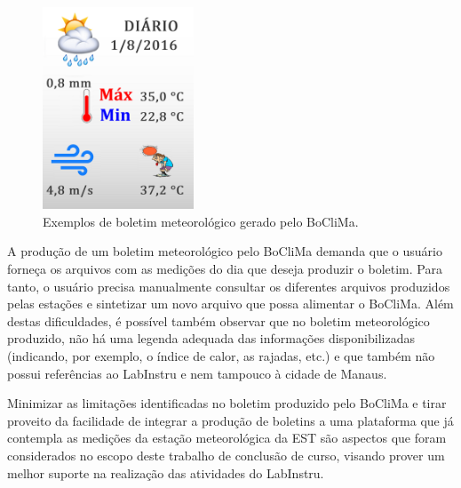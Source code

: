 \begin{figure}[h!]
	\centering
	\includegraphics[width=0.4\textwidth]{./img/boclima}
	\caption{Exemplos de boletim meteorológico gerado pelo BoCliMa. } \label{fig:boclima}
\end{figure}

A produção de um boletim meteorológico pelo BoCliMa demanda que o usuário forneça os arquivos com as medições do dia que deseja produzir o boletim. Para tanto, o usuário precisa manualmente consultar os diferentes arquivos produzidos pelas estações e sintetizar um novo arquivo que possa alimentar o BoCliMa. Além destas dificuldades, é possível também observar que no boletim meteorológico produzido, não há uma legenda adequada das informações disponibilizadas (indicando, por exemplo, o índice de calor, as rajadas, etc.) e que também não possui referências ao LabInstru e nem tampouco à cidade de Manaus.

Minimizar as limitações identificadas no boletim produzido pelo BoCliMa e tirar proveito da facilidade de integrar a produção de boletins a uma plataforma que já contempla as medições da estação meteorológica da EST são aspectos que foram considerados no escopo deste trabalho de conclusão de curso, visando prover um melhor suporte na realização das atividades do LabInstru.
